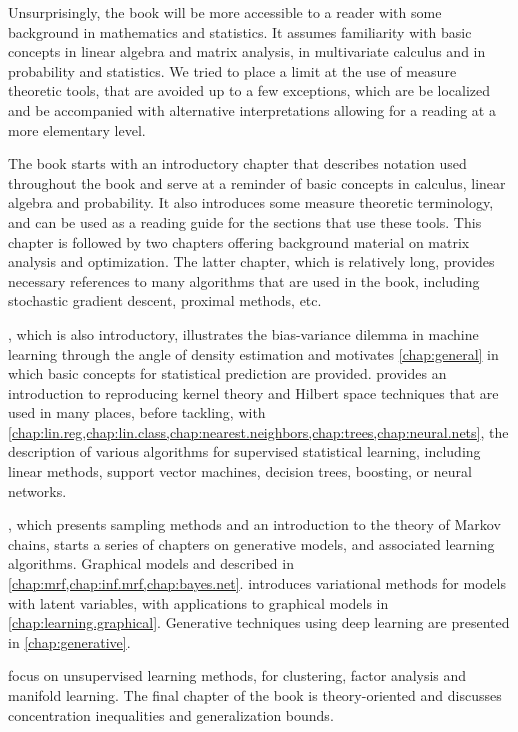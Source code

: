 Unsurprisingly, the book will be  more accessible to a reader with some background in mathematics and statistics. It assumes familiarity with basic concepts in linear algebra and matrix analysis, in multivariate calculus and in probability and statistics. We tried to place a limit at the use of measure theoretic tools, that are avoided up to a few exceptions, which are be localized and be accompanied with alternative interpretations allowing for a reading at a more elementary level. 

The book starts with an introductory chapter that describes notation used throughout the book and serve at a reminder of basic concepts in calculus, linear algebra and probability. It also introduces some measure theoretic terminology, and can be used as a reading guide for the sections that use these tools. This chapter is followed by two chapters offering background material on matrix analysis and optimization. The latter chapter, which is relatively long, provides necessary references to many algorithms that are used in the book, including stochastic gradient descent, proximal methods, etc. 

, which is also introductory, illustrates the bias-variance dilemma in machine learning through the angle of density estimation and motivates \cref{chap:general} in which basic concepts for statistical prediction are provided.  provides an introduction to reproducing kernel theory and Hilbert space techniques that are used in many places, before tackling, with \cref{chap:lin.reg,chap:lin.class,chap:nearest.neighbors,chap:trees,chap:neural.nets}, the description of various algorithms for supervised statistical learning, including linear methods, support vector machines, decision trees, boosting, or neural networks.

, which presents sampling methods and an introduction to the theory of Markov chains, starts a series of chapters on generative models, and associated learning algorithms. Graphical models and described in \cref{chap:mrf,chap:inf.mrf,chap:bayes.net}.  introduces variational methods for models with latent variables, with applications to graphical models in \cref{chap:learning.graphical}. Generative techniques using deep learning are presented in \cref{chap:generative}.

 focus on unsupervised learning methods, for clustering, factor analysis and manifold learning. The final chapter of the book is theory-oriented and discusses concentration inequalities and generalization bounds.

